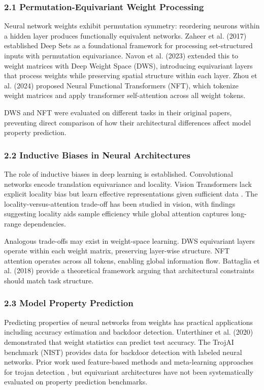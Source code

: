 
\subsubsection{2.1 Permutation-Equivariant Weight Processing}

Neural network weights exhibit permutation symmetry: reordering neurons within a hidden layer produces functionally equivalent networks. Zaheer et al. (2017) established Deep Sets as a foundational framework for processing set-structured inputs with permutation equivariance. Navon et al. (2023) extended this to weight matrices with Deep Weight Space (DWS), introducing equivariant layers that process weights while preserving spatial structure within each layer. Zhou et al. (2024) proposed Neural Functional Transformers (NFT), which tokenize weight matrices and apply transformer self-attention across all weight tokens.

DWS and NFT were evaluated on different tasks in their original papers, preventing direct comparison of how their architectural differences affect model property prediction.

\subsubsection{2.2 Inductive Biases in Neural Architectures}

The role of inductive biases in deep learning is established. Convolutional networks encode translation equivariance and locality. Vision Transformers lack explicit locality bias but learn effective representations given sufficient data \citep{dosovitskiy2020vit}. The locality-versus-attention trade-off has been studied in vision, with findings suggesting locality aids sample efficiency while global attention captures long-range dependencies.

Analogous trade-offs may exist in weight-space learning. DWS equivariant layers operate within each weight matrix, preserving layer-wise structure. NFT attention operates across all tokens, enabling global information flow. Battaglia et al. (2018) provide a theoretical framework arguing that architectural constraints should match task structure.

\subsubsection{2.3 Model Property Prediction}

Predicting properties of neural networks from weights has practical applications including accuracy estimation and backdoor detection. Unterthiner et al. (2020) demonstrated that weight statistics can predict test accuracy. The TrojAI benchmark (NIST) provides data for backdoor detection with labeled neural networks. Prior work used feature-based methods and meta-learning approaches for trojan detection \citep{wang2019trojan}, but equivariant architectures have not been systematically evaluated on property prediction benchmarks.
